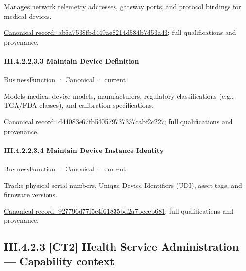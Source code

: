 Manages network telemetry addresses, gateway ports, and protocol bindings for medical devices.


{\footnotesize \href{../../../../../../../continuum/business/business-function/ab5a7538fbd449ae8214d584b7d53a43.md}{Canonical record: ab5a7538fbd449ae8214d584b7d53a43}; full qualifications and provenance.}\par
\paragraph*{III.4.2.2.3.3 Maintain Device Definition}
\label{navigation:III.4.2.2.3.3}

\label{element:d44083e67fb540579737337cabf2c227}
{\small BusinessFunction · Canonical · current}\par

Models medical device models, manufacturers, regulatory classifications (e.g., TGA/FDA classes), and calibration specifications.


{\footnotesize \href{../../../../../../../continuum/business/business-function/d44083e67fb540579737337cabf2c227.md}{Canonical record: d44083e67fb540579737337cabf2c227}; full qualifications and provenance.}\par
\paragraph*{III.4.2.2.3.4 Maintain Device Instance Identity}
\label{navigation:III.4.2.2.3.4}

\label{element:927796d77f5e4f61835bd2a7bcceb681}
{\small BusinessFunction · Canonical · current}\par

Tracks physical serial numbers, Unique Device Identifiers (UDI), asset tags, and firmware versions.


{\footnotesize \href{../../../../../../../continuum/business/business-function/927796d77f5e4f61835bd2a7bcceb681.md}{Canonical record: 927796d77f5e4f61835bd2a7bcceb681}; full qualifications and provenance.}\par
\subsection*{III.4.2.3 [CT2] Health Service Administration — Capability context}
\label{navigation:III.4.2.3}

